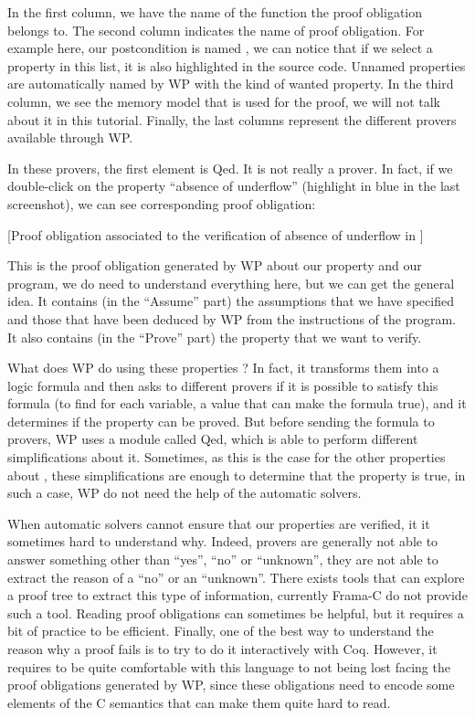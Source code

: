 \documentclass[middle]{zmdocument}
\begin{document}
In the first column, we have the name of the function the proof
obligation belongs to. The second column indicates the name of proof
obligation. For example here, our postcondition is named
, we can notice
that if we select a property in this list, it is also highlighted in the
source code. Unnamed properties are automatically named by WP with the
kind of wanted property. In the third column, we see the memory model
that is used for the proof, we will not talk about it in this tutorial.
Finally, the last columns represent the different provers available
through WP.



In these provers, the first element is Qed. It is not really a prover.
In fact, if we double-click on the property ``absence of underflow''
(highlight in blue in the last screenshot), we can see corresponding
proof obligation:



[Proof obligation associated to the verification of absence of
  underflow in ]


This is the proof obligation generated by WP about our property and our
program, we do need to understand everything here, but we can get the
general idea. It contains (in the ``Assume'' part) the assumptions that
we have specified and those that have been deduced by WP from the
instructions of the program. It also contains (in the ``Prove'' part)
the property that we want to verify.



What does WP do using these properties ? In fact, it transforms them
into a logic formula and then asks to different provers if it is
possible to satisfy this formula (to find for each variable, a value
that can make the formula true), and it determines if the property can
be proved. But before sending the formula to provers, WP uses a module
called Qed, which is able to perform different simplifications about it.
Sometimes, as this is the case for the other properties about
, these simplifications are enough to determine that the
property is true, in such a case, WP do not need the help of the
automatic solvers.



When automatic solvers cannot ensure that our properties are verified,
it it sometimes hard to understand why. Indeed, provers are generally
not able to answer something other than ``yes'', ``no'' or ``unknown'',
they are not able to extract the reason of a ``no'' or an ``unknown''.
There exists tools that can explore a proof tree to extract this type of
information, currently Frama-C do not provide such a tool. Reading proof
obligations can sometimes be helpful, but it requires a bit of practice
to be efficient. Finally, one of the best way to understand the reason
why a proof fails is to try to do it interactively with Coq. However, it
requires to be quite comfortable with this language to not being lost
facing the proof obligations generated by WP, since these obligations
need to encode some elements of the C semantics that can make them quite
hard to read.
\end{document}
